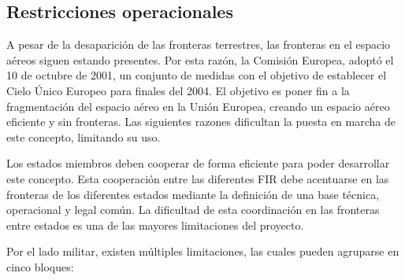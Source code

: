 \subsection{Restricciones operacionales}

A pesar de la desaparición de las fronteras terrestres, las fronteras en el espacio aéreos siguen estando presentes. Por esta razón, la Comisión Europea, adoptó el 10 de octubre de 2001, un conjunto de medidas con el objetivo de establecer el Cielo Único Europeo para finales del 2004. El objetivo es poner fin a la fragmentación del espacio aéreo en la Unión Europea, creando un espacio aéreo eficiente y sin fronteras. Las siguientes razones dificultan la puesta en marcha de este concepto, limitando su uso.  

Los estados miembros deben cooperar de forma eficiente para poder desarrollar este concepto. Esta cooperación entre las diferentes FIR debe acentuarse en las fronteras de los diferentes estados mediante la definición de una base técnica, operacional y legal común. La dificultad de esta coordinación en las fronteras entre estados es una de las mayores limitaciones del proyecto.

Por el lado militar, existen múltiples limitaciones, las cuales pueden agruparse en cinco bloques:

